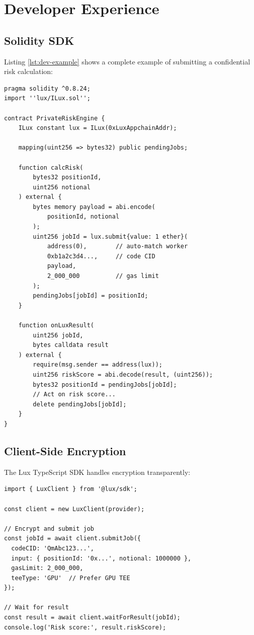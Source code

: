 \section{Developer Experience}

\label{sec:dev-experience}

\subsection{Solidity SDK}

Listing \ref{lst:dev-example} shows a complete example of submitting a confidential risk calculation:

\begin{lstlisting}[caption={Private Risk Engine Example},label={lst:dev-example}]
pragma solidity ^0.8.24;
import ''lux/ILux.sol'';

contract PrivateRiskEngine {
    ILux constant lux = ILux(0xLuxAppchainAddr);

    mapping(uint256 => bytes32) public pendingJobs;

    function calcRisk(
        bytes32 positionId,
        uint256 notional
    ) external {
        bytes memory payload = abi.encode(
            positionId, notional
        );
        uint256 jobId = lux.submit{value: 1 ether}(
            address(0),        // auto-match worker
            0xb1a2c3d4...,     // code CID
            payload,
            2_000_000          // gas limit
        );
        pendingJobs[jobId] = positionId;
    }

    function onLuxResult(
        uint256 jobId,
        bytes calldata result
    ) external {
        require(msg.sender == address(lux));
        uint256 riskScore = abi.decode(result, (uint256));
        bytes32 positionId = pendingJobs[jobId];
        // Act on risk score...
        delete pendingJobs[jobId];
    }
}
\end{lstlisting}

\subsection{Client-Side Encryption}

The Lux TypeScript SDK handles encryption transparently:

\begin{lstlisting}[language=Solidity,caption={TypeScript SDK Usage}]
import { LuxClient } from '@lux/sdk';

const client = new LuxClient(provider);

// Encrypt and submit job
const jobId = await client.submitJob({
  codeCID: 'QmAbc123...',
  input: { positionId: '0x...', notional: 1000000 },
  gasLimit: 2_000_000,
  teeType: 'GPU'  // Prefer GPU TEE
});

// Wait for result
const result = await client.waitForResult(jobId);
console.log('Risk score:', result.riskScore);
\end{lstlisting}


